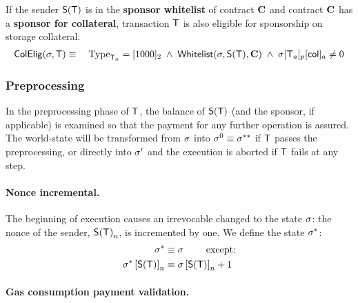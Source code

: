 If the sender $\mathsf{S}{\left({\textsf{T}} \right)}$ is in the {\bf sponsor whitelist} of contract $\mathbf{C}$ and contract $\mathbf{C}$ has a {\bf sponsor for collateral}, transaction $\textsf{T}$ is also eligible for sponsorship on storage collateral.
\begin{align}
	\mathsf{ColElig}(\mathbf{\sigma},\textsf{T})\equiv \quad \mathrm{Type}_{\textsf{T}_a}=[1000]_2 \;\wedge\; \mathsf{Whitelist}(\mathbf{\sigma},\mathsf{S}{\left({\textsf{T}} \right)},\mathbf{C}) \;\wedge\; \mathbf{\sigma}[\textsf{T}_a]_p[\mathsf{col}]_a\neq 0
\end{align}

\subsubsection{Preprocessing}
\label{subsubsec:preprocessing}

In the preprocessing phase of $\textsf{T}$, the balance of $\mathsf{S}{\left({\textsf{T}} \right)}$ (and the sponsor, if applicable) is examined so that the payment for any further operation is assured.
The world-state will be transformed from $\mathbf{\sigma}$ into $\mathbf{\sigma}^0\equiv \mathbf{\sigma}^{**}$ if $\textsf{T}$ passes the preprocessing, or directly into $\mathbf{\sigma}'$ and the execution is aborted if $\textsf{T}$ fails at any step.

\paragraph{Nonce incremental.}
The beginning of execution 
causes an irrevocable changed to the state $\mathbf{\sigma}$: 
the nonce of the sender, $\mathsf{S}{\left({\textsf{T}} \right)}_n$, is incremented by one. 
%
We define the state $\mathbf{\sigma}^*$:
\begin{align}
	\mathbf{\sigma}^*  &\equiv \mathbf{\sigma} \qquad \mbox{  except:}\\
	\mathbf{\sigma}^*\left[\mathsf{S}{\left({\textsf{T}} \right)} \right]_n &\equiv \mathbf{\sigma}\left[\mathsf{S}{\left({\textsf{T}} \right)} \right]_n+1 
\end{align}

\paragraph{Gas consumption payment validation.}

